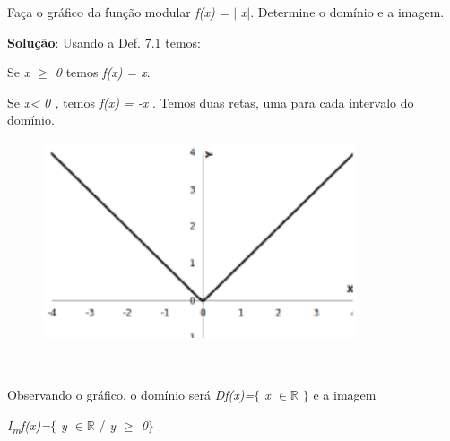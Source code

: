 \begin{texemplo}

Faça o gráfico da função modular \textit{f(x) =} $ \vert $ \textit{x}$ \vert $. Determine o domínio e a imagem.  

\textbf{Solução}: Usando a Def. 7.1 temos:

\quad Se \textit{x $ \geq $  0} temos \textit{f(x) = x}.

\quad Se \textit{x< 0 , } temos \textit{f(x) = -x }. Temos duas retas, uma para cada intervalo do domínio.

\begin{figure}[H]
	\begin{Center}
		\includegraphics[width=3.64in,height=2.3in]{capitulos/outras_funcoes/media/image24.pdf}
	\end{Center}
\end{figure}

~~

\quad Observando o gráfico, o domínio será   \textit{Df(x)=$ \{ $ x $ \in \mathbb{R} $  \textbf{ }$ \} $ } e a imagem 

\quad  \textit{I\textsubscript{m}f(x)=$ \{ $ y $ \in \mathbb{R} $  }/ \textit{y $ \geq $  0$ \} $ } \qedsymbol{}
\end{texemplo}

